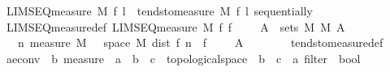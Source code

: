\begin{isabellebody}
\isanewline
{}\isamarkupfalse%
\ {\isachardoublequoteopen}LIMSEQ{\isacharunderscore}{\kern0pt}measure\ M\ f\ l\ {\isasymequiv}\ tendsto{\isacharunderscore}{\kern0pt}measure\ M\ f\ l\ sequentially{\isachardoublequoteclose}\isanewline
\isanewline
{}\isamarkupfalse%
\ LIMSEQ{\isacharunderscore}{\kern0pt}measure{\isacharunderscore}{\kern0pt}def{\isacharcolon}{\kern0pt}\ {\isachardoublequoteopen}LIMSEQ{\isacharunderscore}{\kern0pt}measure\ M\ f{\isacharprime}{\kern0pt}\ f\ {\isacharequal}{\kern0pt}\ {\isacharparenleft}{\kern0pt}{\isasymforall}{\isasymepsilon}\ {\isachargreater}{\kern0pt}\ {}{\isachardot}{\kern0pt}\ {\isasymforall}A\ {\isasymin}\ sets\ M{\isachardot}{\kern0pt}\ M\ A\ {\isasymnoteq}\ {\isasyminfinity}\ {\isasymlongrightarrow}\isanewline
\ \ \ {\isacharparenleft}{\kern0pt}{\isasymlambda}n{\isachardot}{\kern0pt}\ measure\ M\ {\isacharparenleft}{\kern0pt}{\isacharbraceleft}{\kern0pt}{\isasymomega}\ {\isasymin}\ space\ M{\isachardot}{\kern0pt}\ dist\ {\isacharparenleft}{\kern0pt}f{\isacharprime}{\kern0pt}\ n\ {\isasymomega}{\isacharparenright}{\kern0pt}\ {\isacharparenleft}{\kern0pt}f\ {\isasymomega}{\isacharparenright}{\kern0pt}\ {\isachargreater}{\kern0pt}\ {\isasymepsilon}{\isacharbraceright}{\kern0pt}\ {\isasyminter}\ A{\isacharparenright}{\kern0pt}{\isacharparenright}{\kern0pt}\ {\isasymlonglonglongrightarrow}\ {}{\isacharparenright}{\kern0pt}{\isachardoublequoteclose}\isanewline
%
\isadelimproof
\ \ \ \ %
\endisadelimproof
%
\isatagproof
{}\isamarkupfalse%
\ tendsto{\isacharunderscore}{\kern0pt}measure{\isacharunderscore}{\kern0pt}def\ \isacommand{{\isachardot}{\kern0pt}{\isachardot}{\kern0pt}}\isamarkupfalse%
%
\endisatagproof
{\isafoldproof}%
%
\isadelimproof
\isanewline
%
\endisadelimproof
\isanewline
{}\isamarkupfalse%
\ ae{\isacharunderscore}{\kern0pt}conv\ {\isacharcolon}{\kern0pt}{\isacharcolon}{\kern0pt}\ {\isachardoublequoteopen}{\isacharprime}{\kern0pt}b\ measure\ {\isasymRightarrow}\ {\isacharparenleft}{\kern0pt}{\isacharprime}{\kern0pt}a\ {\isasymRightarrow}\ {\isacharprime}{\kern0pt}b\ {\isasymRightarrow}\ {\isacharprime}{\kern0pt}c\ {\isacharcolon}{\kern0pt}{\isacharcolon}{\kern0pt}\ topological{\isacharunderscore}{\kern0pt}space{\isacharparenright}{\kern0pt}\ {\isasymRightarrow}\ {\isacharparenleft}{\kern0pt}{\isacharprime}{\kern0pt}b\ {\isasymRightarrow}\ {\isacharprime}{\kern0pt}c{\isacharparenright}{\kern0pt}\ {\isasymRightarrow}\ {\isacharprime}{\kern0pt}a\ filter\ {\isasymRightarrow}\ bool{\isachardoublequoteclose}\ \isanewline

\end{isabellebody}
